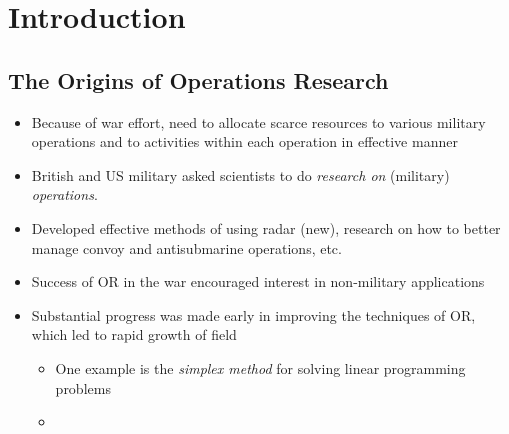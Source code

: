 \documentclass{article}
\begin{document}
\section{Introduction}
\subsection{The Origins of Operations Research}
\begin{itemize}
\item Because of war effort, need to allocate scarce resources to various military operations and to activities within each operation in effective manner
\item British and US military asked scientists to do \textit{ research on } (military) \textit{ operations}.
\item Developed effective methods of using radar (new), research on how to better manage convoy and antisubmarine operations, etc.
\item Success of OR in the war encouraged interest in non-military applications
\item Substantial progress was made early in improving the techniques of OR, which led to rapid growth of field
	\begin{itemize}
	\item One example is the \textit{simplex method} for solving linear programming problems
    \item 
	\end{itemize}
\end{itemize}
\end{document}
